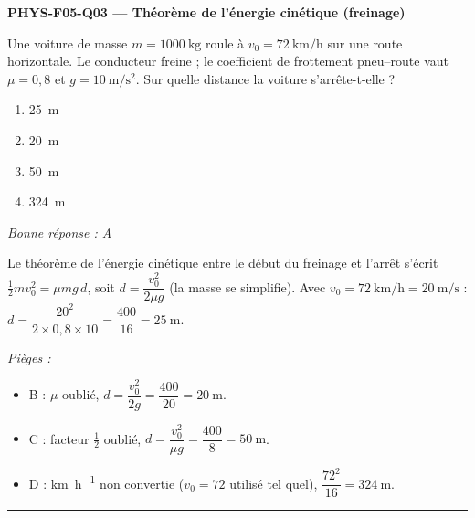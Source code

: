 \documentclass[11pt,a4paper]{article}
\begin{document}
\noindent\textbf{PHYS-F05-Q03 --- Théorème de l'énergie cinétique (freinage)}\par
Une voiture de masse $m=\qty{1000}{\kilogram}$ roule à $v_0=\qty{72}{\kilo\metre\per\hour}$ sur une
route horizontale. Le conducteur freine ; le coefficient de frottement pneu--route vaut $\mu=0{,}8$
et $g=\qty{10}{\metre\per\second\squared}$. Sur quelle distance la voiture s'arrête-t-elle ?
\begin{enumerate}[label=\Alph*)]
\item \qty{25}{\metre}
\item \qty{20}{\metre}
\item \qty{50}{\metre}
\item \qty{324}{\metre}
\end{enumerate}
\textit{Bonne réponse : A}\par
Le théorème de l'énergie cinétique entre le début du freinage et l'arrêt s'écrit
$\tfrac12 m v_0^2=\mu m g\,d$, soit $d=\dfrac{v_0^2}{2\mu g}$ (la masse se simplifie).
Avec $v_0=\qty{72}{\kilo\metre\per\hour}=\qty{20}{\metre\per\second}$ :
$d=\dfrac{20^2}{2\times0{,}8\times10}=\dfrac{400}{16}=\qty{25}{\metre}$.\par
\textit{Pièges :}
\begin{itemize}
\item B : $\mu$ oublié, $d=\dfrac{v_0^2}{2g}=\dfrac{400}{20}=\qty{20}{\metre}$.
\item C : facteur $\tfrac12$ oublié, $d=\dfrac{v_0^2}{\mu g}=\dfrac{400}{8}=\qty{50}{\metre}$.
\item D : \si{\kilo\metre\per\hour} non convertie ($v_0=72$ utilisé tel quel), $\dfrac{72^2}{16}=\qty{324}{\metre}$.
\end{itemize}
\vspace{8pt}\hrule\vspace{8pt}
\end{document}
